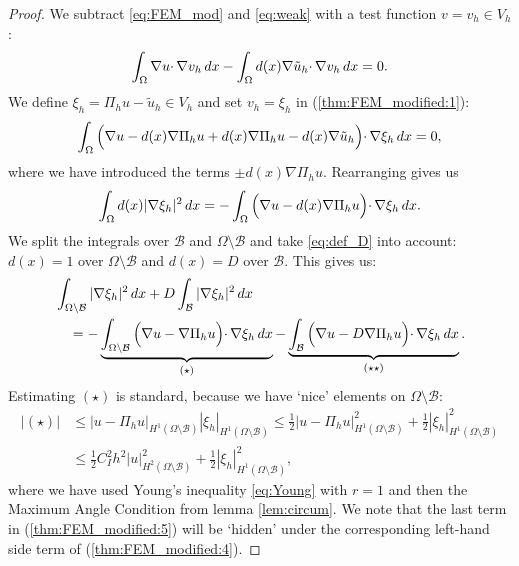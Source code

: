 \documentclass{article}
\theoremstyle{remark}
\def \d {{\rm d}}
\def\dx{\,\d x }
\def\B{\mathcal{B}}
\def\tu{\tilde{u}}
\begin{document}
    \begin{proof}
    We subtract \eqref{eq:FEM_mod} and \eqref{eq:weak} with a test function $v=v_h\in V_h$:
    \begin{equation}
    \label{thm:FEM_modified:1}
    \int_\Omega\nabla u\cdotp\nabla v_h \dx- \int_\Omega d(x)\nabla \tu_h\cdotp\nabla v_h \dx =0.
    \end{equation}
    We define $\xi_h=\Pi_h u-\tu_h\in V_h$ and set $v_h=\xi_h$ in (\ref{thm:FEM_modified:1}):
    \begin{equation*}
    \label{thm:FEM_modified:2}
    \int_\Omega\Big(\nabla u -d(x)\nabla\Pi_h u +d(x)\nabla \Pi_h u -d(x)\nabla \tu_h\Big)\cdotp\nabla \xi_h \dx =0,
    \end{equation*}
    where we have  introduced the terms $\pm d(x)\nabla\Pi_h u$. Rearranging gives us
    \begin{equation*}
    \label{thm:FEM_modified:3}
    \int_\Omega d(x) |\nabla \xi_h|^2\dx = -\int_\Omega \Big(\nabla u -d(x)\nabla\Pi_h u\Big)\cdotp\nabla \xi_h \dx.
    \end{equation*}
    We split the integrals over $\B$ and $\Omega\setminus\B$ and take \eqref{eq:def_D} into account: $d(x) = 1$ over $\Omega \setminus \B$ and $d(x) = D$ over $\B$. This gives us:
    \begin{equation}
    \label{thm:FEM_modified:4}
    \begin{split}
    &\int_{\Omega\setminus\B} |\nabla \xi_h|^2\dx +D\int_{\B} |\nabla \xi_h|^2\dx\\
    &\quad= -\underbrace{\int_{\Omega\setminus\B} \Big(\nabla u -\nabla\Pi_h u\Big)\cdotp\nabla \xi_h \dx}_{(\star)} -\underbrace{\int_\B \Big(\nabla u -D\nabla\Pi_h u\Big)\cdotp\nabla \xi_h \dx}_{(\star\star)}.
    \end{split}
    \end{equation}
    Estimating $(\star)$ is standard, because we have `nice' elements on $\Omega\setminus\B$:
    \begin{equation}
    \begin{split}
    \label{thm:FEM_modified:5}
    \big|(\star)\big| &\leq |u-\Pi_h u|_{H^1(\Omega\setminus\B)}|\xi_h|_{H^1(\Omega\setminus\B)} \leq \tfrac{1}{2}|u-\Pi_h u|_{H^1(\Omega\setminus\B)}^2+\tfrac{1}{2}|\xi_h|_{H^1(\Omega\setminus\B)}^2\\
    &\leq \tfrac{1}{2}C_I^2h^2|u|_{H^2(\Omega\setminus\B)}^2 +\tfrac{1}{2}|\xi_h|_{H^1(\Omega\setminus\B)}^2,
    \end{split}
    \end{equation}
    where we have used Young's inequality \eqref{eq:Young} with $r=1$ and then the Maximum Angle Condition from lemma \ref{lem:circum}. We note that the last term in (\ref{thm:FEM_modified:5}) will be `hidden' under the corresponding left-hand side term of (\ref{thm:FEM_modified:4}).
    

\end{proof}
\end{document}
